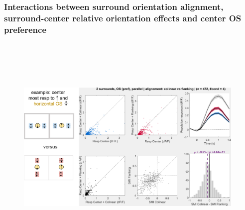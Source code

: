 % 
%    
%           
%
%        

\subsubsection{Interactions between surround orientation alignment, surround-center relative orientation effects and center OS preference}

\begin{figure}[H] \centering \includegraphics[width=11cm,height=11cm,keepaspectratio]{Figures/7.Results/population/sel/diagrams/13.png} 
\end{figure}

